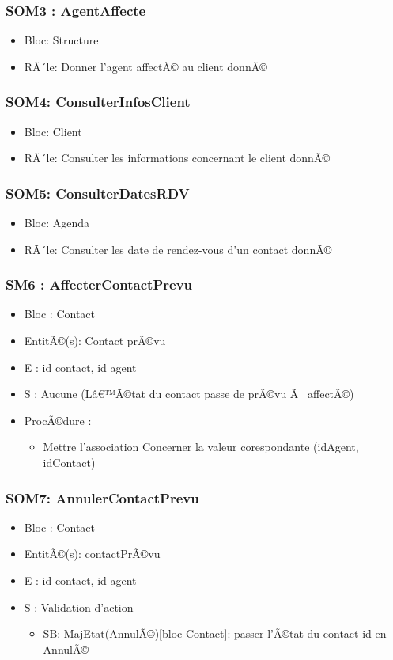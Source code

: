 \subsubsection{SOM3 : AgentAffecte}
\begin{itemize}
\item Bloc: Structure
\item RÃ´le: Donner l'agent affectÃ© au client donnÃ©
\end{itemize}
\subsubsection{SOM4: ConsulterInfosClient}
\begin{itemize}
\item Bloc: Client
\item RÃ´le: Consulter les informations concernant le client donnÃ©
\end{itemize}
\subsubsection{SOM5: ConsulterDatesRDV}
\begin{itemize}
\item Bloc: Agenda
\item RÃ´le: Consulter les date de rendez-vous d'un contact donnÃ©
\end{itemize}
\subsubsection{SM6 : AffecterContactPrevu}
\begin{itemize}
\item Bloc : Contact
\item EntitÃ©(s): Contact prÃ©vu
\item E : id contact, id agent
\item S : Aucune (Lâ€™Ã©tat du contact passe de prÃ©vu Ã  affectÃ©)
\item ProcÃ©dure : 	
\begin{itemize}		
\item Mettre l'association Concerner la valeur corespondante (idAgent, idContact)
\end{itemize}
\end{itemize}
\subsubsection{SOM7: AnnulerContactPrevu}
\begin{itemize}
\item Bloc : Contact
\item EntitÃ©(s): contactPrÃ©vu
\item E : id contact, id agent
\item S : Validation d'action
\begin{itemize}		
\item SB: MajEtat(AnnulÃ©)[bloc Contact]: passer l'Ã©tat du contact id en AnnulÃ©
\end{itemize}
\end{itemize}
